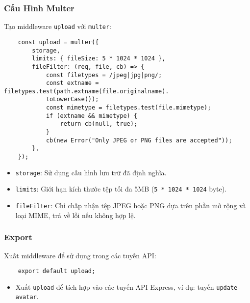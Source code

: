             \subsubsection{Cấu Hình Multer}
                \hspace*{0.6cm}Tạo middleware \texttt{upload} với \texttt{multer}:
                \begin{lstlisting}
    const upload = multer({
        storage,
        limits: { fileSize: 5 * 1024 * 1024 },
        fileFilter: (req, file, cb) => {
            const filetypes = /jpeg|jpg|png/;
            const extname = filetypes.test(path.extname(file.originalname).
            toLowerCase());
            const mimetype = filetypes.test(file.mimetype);
            if (extname && mimetype) {
                return cb(null, true);
            }
            cb(new Error("Only JPEG or PNG files are accepted"));
        },
    });
                \end{lstlisting}
                \begin{itemize}
                    \item \texttt{storage}: Sử dụng cấu hình lưu trữ đã định nghĩa.
                    \item \texttt{limits}: Giới hạn kích thước tệp tối đa 5MB (\texttt{5 * 1024 * 1024} byte).
                    \item \texttt{fileFilter}: Chỉ chấp nhận tệp JPEG hoặc PNG dựa trên phần mở rộng và loại MIME, trả về lỗi nếu không hợp lệ.
                \end{itemize}

            \subsubsection{Export}
                \hspace*{0.6cm}Xuất middleware để sử dụng trong các tuyến API:
                \begin{lstlisting}
    export default upload;
                \end{lstlisting}
                \begin{itemize}
                    \item Xuất \texttt{upload} để tích hợp vào các tuyến API Express, ví dụ: tuyến \texttt{update-avatar}.
                \end{itemize}

